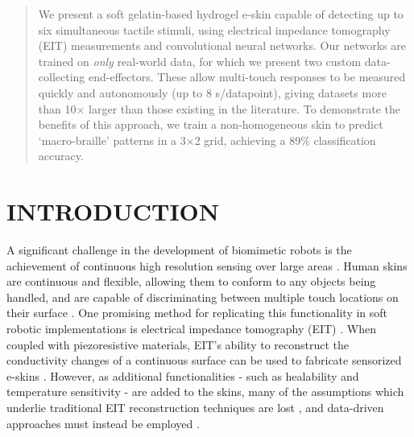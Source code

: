 \begin{abstract}
We present a soft gelatin-based hydrogel e-skin capable of detecting up to six simultaneous tactile stimuli, using electrical impedance tomography (EIT) measurements and convolutional neural networks. Our networks are trained on \textit{only} real-world data, for which we present two custom data-collecting end-effectors. These allow multi-touch responses to be measured quickly and autonomously (up to 8 s/datapoint), giving datasets more than 10$\times$ larger than those existing in the literature. To demonstrate the benefits of this approach, we train a non-homogeneous skin to predict `macro-braille' patterns in a 3$\times$2 grid, achieving a 89\% classification accuracy.
\end{abstract}


\section{INTRODUCTION}

A significant challenge in the development of biomimetic robots is the achievement of continuous high resolution sensing over large areas \cite{Shih2020, Liu2022}. Human skins are continuous and flexible, allowing them to conform to any objects being handled, and are capable of discriminating between multiple touch locations on their surface \cite{gellis1977two}. One promising method for replicating this functionality in soft robotic implementations is electrical impedance tomography (EIT) \cite{Barber1984, Cheney1999, Russo2017, xin2023electrical, Alian2023Soft}. When coupled with piezoresistive materials, EIT's ability to reconstruct the conductivity changes of a continuous surface can be used to fabricate sensorized e-skins \cite{Liu2020, Silvera2015Artificial}. However, as additional functionalities - such as healability and temperature sensitivity - are added to the skins, many of the assumptions which underlie traditional EIT reconstruction techniques are lost \cite{TerrynLearning, Georgopoulou2023sensorized, Abdelwahed2022Using}, and data-driven approaches must instead be employed \cite{Wang2015Optimized, wang2020deep}.

